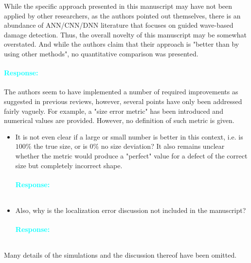 \documentclass[11pt,a2paper]{report}
\begin{document}
	While the specific approach presented in this manuscript may have not been applied by other researchers, as the authors pointed out themselves, there is an abundance of ANN/CNN/DNN literature that focuses on guided wave-based damage detection. 
	Thus, the overall novelty of this manuscript may be somewhat overstated. And while the authors claim that their approach is "better than by using other methods", no quantitative comparison was presented. 
	\\ \\
	\textcolor{Cyan}{
		\textbf{Response:}}
	\\ \\
	The authors seem to have implemented a number of required improvements as suggested in previous reviews, however, several points have only been addressed fairly vaguely. 
	For example, a "size error metric" has been introduced and numerical values are provided. 
	However, no definition of such metric is given. 
	\begin{itemize}
		\item It is not even clear if a large or small number is better in this context, i.e. is \(100\%\) the true size, or is \(0\%\) no size deviation? It also remains unclear whether the metric would produce a "perfect" value for a defect of the correct size but completely incorrect shape. 
			\\ \\
		\textcolor{Cyan}{
			\textbf{Response:}}
		\\ \\
		\item Also, why is the localization error discussion not included in the manuscript?
			\\ \\
		\textcolor{Cyan}{
			\textbf{Response:}}
		\\ \\
	\end{itemize}
	
	Many details of the simulations and the discussion thereof have been omitted. 
	
\end{document}
